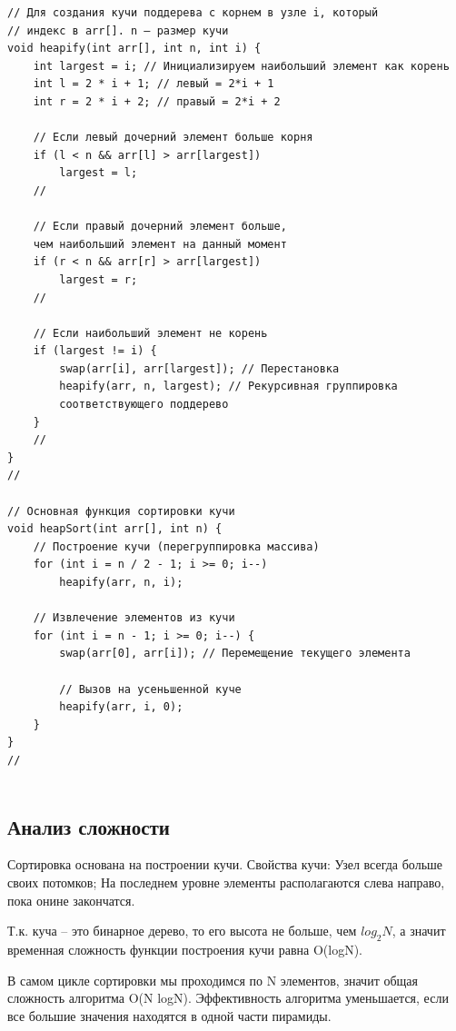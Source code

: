 \documentclass[bachelor, och, referat, times]{SCWorks}
\begin{document}
\begin{verbatim}
// Для создания кучи поддерева с корнем в узле i, который
// индекс в arr[]. n — размер кучи
void heapify(int arr[], int n, int i) {
    int largest = i; // Инициализируем наибольший элемент как корень
    int l = 2 * i + 1; // левый = 2*i + 1
    int r = 2 * i + 2; // правый = 2*i + 2

    // Если левый дочерний элемент больше корня
    if (l < n && arr[l] > arr[largest])
        largest = l;
    //

    // Если правый дочерний элемент больше, 
    чем наибольший элемент на данный момент
    if (r < n && arr[r] > arr[largest])
        largest = r;
    //

    // Если наибольший элемент не корень
    if (largest != i) {
        swap(arr[i], arr[largest]); // Перестановка
        heapify(arr, n, largest); // Рекурсивная группировка 
        соответствующего поддерево
    }
    //
}
//

// Основная функция сортировки кучи
void heapSort(int arr[], int n) {
    // Построение кучи (перегруппировка массива)
    for (int i = n / 2 - 1; i >= 0; i--)
        heapify(arr, n, i);

    // Извлечение элементов из кучи
    for (int i = n - 1; i >= 0; i--) {
        swap(arr[0], arr[i]); // Перемещение текущего элемента

        // Вызов на усеньшенной куче
        heapify(arr, i, 0);
    }
}
//


 \end{verbatim}

 \subsection{Анализ сложности}

 Сортировка основана на построении кучи. Свойства кучи:
Узел всегда больше своих потомков;
На последнем уровне элементы располагаются слева направо, пока онине закончатся.

Т.к. куча – это бинарное дерево, то его высота не больше, чем $log_2 N$, 
а значит временная сложность функции построения кучи равна O(logN).

В самом цикле сортировки мы проходимся по N элементов, 
значит общая сложность алгоритма O(N logN).
Эффективность алгоритма уменьшается, 
если все большие значения находятся в одной части пирамиды.



    \appendix
     
\end{document}
